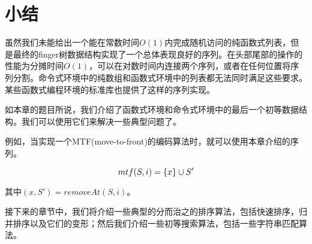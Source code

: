 \documentclass[UTF8]{article}
\begin{document}
\section{小结}

虽然我们未能给出一个能在常数时间$O(1)$内完成随机访问的纯函数式列表，但是最终的finger树数据结构实现了一个总体表现良好的序列。在头部尾部的操作的性能为分摊时间$O(1)$，可以在对数时间内连接两个序列，或者在任何位置将序列分割。命令式环境中的纯数组和函数式环境中的列表都无法同时满足这些要求。某些函数式编程环境的标准库也提供了这样的序列实现\cite{hackage-ftr}。

如本章的题目所说，我们介绍了函数式环境和命令式环境中的最后一个初等数据结构。我们可以使用它们来解决一些典型问题了。

例如，当实现一个MTF(move-to-front)的编码算法时\cite{mtf-wiki}，就可以使用本章介绍的序列。

\[
mtf(S, i) = \{x\} \cup S' \\
\]

其中$(x, S') = removeAt(S, i)$。

接下来的章节中，我们将介绍一些典型的分而治之的排序算法，包括快速排序，归并排序以及它们的变形；然后我们介绍一些初等搜索算法，包括一些字符串匹配算法。

\end{document}
